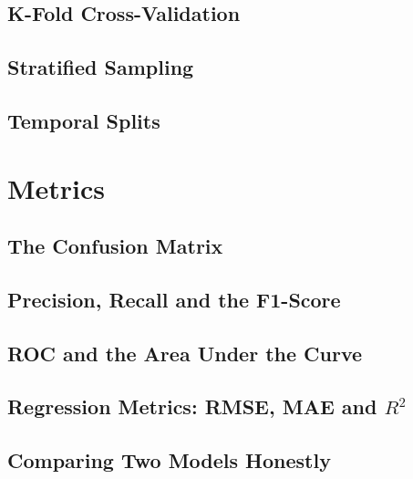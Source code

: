 \subsection{K-Fold Cross-Validation}

\subsection{Stratified Sampling}

\subsection{Temporal Splits}


\section{Metrics}
\label{sec:metrics}

\subsection{The Confusion Matrix}

\subsection{Precision, Recall and the F1-Score}

\subsection{ROC and the Area Under the Curve}

\subsection{Regression Metrics: RMSE, MAE and \texorpdfstring{$R^2$}{R-squared}}

\subsection{Comparing Two Models Honestly}


